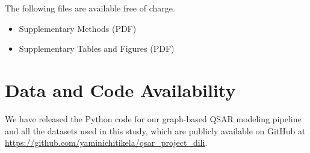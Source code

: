 \documentclass[letterpaper]{article}
\begin{document}
The following files are available free of charge.
\begin{itemize}
  \item Supplementary Methods (PDF)
  \item Supplementary Tables and Figures (PDF)
\end{itemize}

\section*{Data and Code Availability}

We have released the Python code for our graph-based QSAR modeling pipeline and all the datasets used in this study, which are publicly available on GitHub at \url{https://github.com/yaminichitikela/qsar_project_dili}.

\printbibliography
% 






\end{document}
